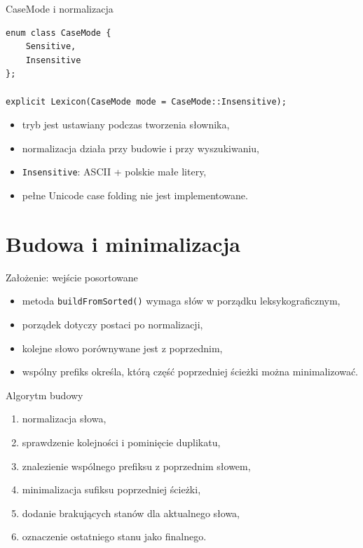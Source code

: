 \documentclass{beamer}
\begin{document}
\begin{frame}[fragile]{CaseMode i normalizacja}
    \begin{verbatim}
enum class CaseMode {
    Sensitive,
    Insensitive
};

explicit Lexicon(CaseMode mode = CaseMode::Insensitive);
\end{verbatim}

    \begin{itemize}
        \item tryb jest ustawiany podczas tworzenia słownika,
        \item normalizacja działa przy budowie i przy wyszukiwaniu,
        \item \texttt{Insensitive}: ASCII + polskie małe litery,
        \item pełne Unicode case folding nie jest implementowane.
    \end{itemize}
\end{frame}

\section{Budowa i minimalizacja}

\begin{frame}{Założenie: wejście posortowane}
    \begin{itemize}
        \item metoda \texttt{buildFromSorted()} wymaga słów w porządku leksykograficznym,
        \item porządek dotyczy postaci po normalizacji,
        \item kolejne słowo porównywane jest z poprzednim,
        \item wspólny prefiks określa, którą część poprzedniej ścieżki można minimalizować.
    \end{itemize}
\end{frame}

\begin{frame}{Algorytm budowy}
    \begin{enumerate}
        \item normalizacja słowa,
        \item sprawdzenie kolejności i pominięcie duplikatu,
        \item znalezienie wspólnego prefiksu z poprzednim słowem,
        \item minimalizacja sufiksu poprzedniej ścieżki,
        \item dodanie brakujących stanów dla aktualnego słowa,
        \item oznaczenie ostatniego stanu jako finalnego.
    \end{enumerate}
\end{frame}
\end{document}

